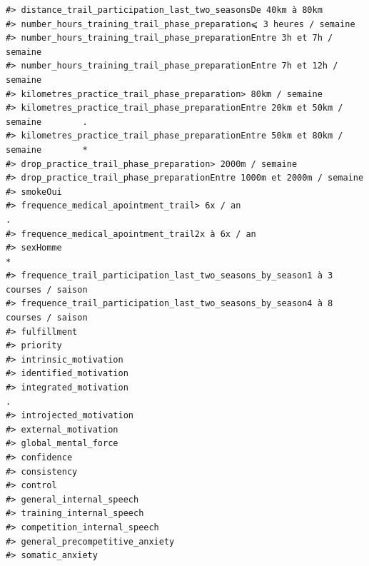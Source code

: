 \documentclass[
]{article}
\begin{document}
\begin{verbatim}
#> distance_trail_participation_last_two_seasonsDe 40km à 80km                      
#> number_hours_training_trail_phase_preparation⩽ 3 heures / semaine                
#> number_hours_training_trail_phase_preparationEntre 3h et 7h / semaine            
#> number_hours_training_trail_phase_preparationEntre 7h et 12h / semaine           
#> kilometres_practice_trail_phase_preparation> 80km / semaine                      
#> kilometres_practice_trail_phase_preparationEntre 20km et 50km / semaine        . 
#> kilometres_practice_trail_phase_preparationEntre 50km et 80km / semaine        * 
#> drop_practice_trail_phase_preparation> 2000m / semaine                           
#> drop_practice_trail_phase_preparationEntre 1000m et 2000m / semaine              
#> smokeOui                                                                         
#> frequence_medical_apointment_trail> 6x / an                                    . 
#> frequence_medical_apointment_trail2x à 6x / an                                   
#> sexHomme                                                                       * 
#> frequence_trail_participation_last_two_seasons_by_season1 à 3 courses / saison   
#> frequence_trail_participation_last_two_seasons_by_season4 à 8 courses / saison   
#> fulfillment                                                                      
#> priority                                                                         
#> intrinsic_motivation                                                             
#> identified_motivation                                                            
#> integrated_motivation                                                          . 
#> introjected_motivation                                                           
#> external_motivation                                                              
#> global_mental_force                                                              
#> confidence                                                                       
#> consistency                                                                      
#> control                                                                          
#> general_internal_speech                                                          
#> training_internal_speech                                                         
#> competition_internal_speech                                                      
#> general_precompetitive_anxiety                                                   
#> somatic_anxiety                                                                  

\end{verbatim}
\end{document}
